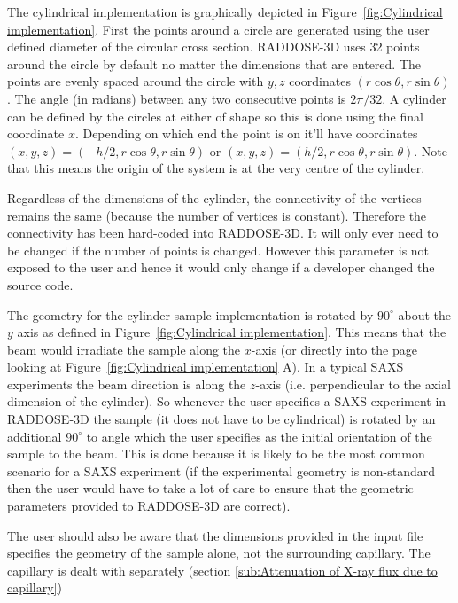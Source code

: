 The cylindrical implementation is graphically depicted in Figure~\ref{fig:Cylindrical implementation}.
First the points around a circle are generated using the user defined diameter of the circular cross section.
RADDOSE-3D uses 32 points around the circle by default no matter the dimensions that are entered.
The points are evenly spaced around the circle with $y, z$ coordinates $(r \cos \theta, r \sin \theta)$.
The angle (in radians) between any two consecutive points is $2 \pi / 32$.
A cylinder can be defined by the circles at either of shape so this is done using the final coordinate $x$.
Depending on which end the point is on it'll have coordinates $(x, y, z) = (-h/2, r \cos \theta, r \sin \theta)$ or $(x, y, z) = (h/2, r \cos \theta, r \sin \theta)$.
Note that this means the origin of the system is at the very centre of the cylinder.

Regardless of the dimensions of the cylinder, the connectivity of the vertices remains the same (because the number of vertices is constant).
Therefore the connectivity has been hard-coded into RADDOSE-3D.
It will only ever need to be changed if the number of points is changed.
However this parameter is not exposed to the user and hence it would only change if a developer changed the source code.

The geometry for the cylinder sample implementation is rotated by $90^{\circ}$ about the $y$ axis as defined in Figure~\ref{fig:Cylindrical implementation}.
This means that the beam would irradiate the sample along the $x$-axis (or directly into the page looking at Figure~\ref{fig:Cylindrical implementation} A).
In a typical SAXS experiments the beam direction is along the $z$-axis (i.e. perpendicular to the axial dimension of the cylinder).
So whenever the user specifies a SAXS experiment in RADDOSE-3D the sample (it does not have to be cylindrical) is rotated by an additional $90^{\circ}$ to angle which the user specifies as the initial orientation of the sample to the beam.
This is done because it is likely to be the most common scenario for a SAXS experiment (if the experimental geometry is non-standard then the user would have to take a lot of care to ensure that the geometric parameters provided to RADDOSE-3D are correct).

The user should also be aware that the dimensions provided in the input file specifies the geometry of the sample alone, not the surrounding capillary. The capillary is dealt with separately (section \ref{sub:Attenuation of X-ray flux due to capillary})

